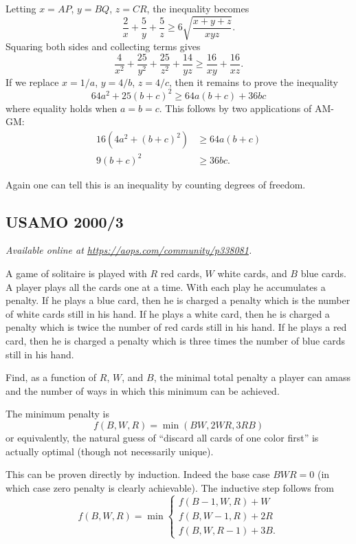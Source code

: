 \documentclass[11pt]{scrartcl}
\begin{document}
Letting $x= AP$, $y = BQ$, $z = CR$, the inequality becomes
\[ \frac2x + \frac5y + \frac5z \ge 6\sqrt{\frac{x+y+z}{xyz}}. \]
Squaring both sides and collecting terms gives
\[
  \frac{4}{x^2} + \frac{25}{y^2} + \frac{25}{z^2} + \frac{14}{yz}
  \ge \frac{16}{xy} + \frac{16}{xz}.
\]
If we replace $x=1/a$, $y=4/b$, $z=4/c$,
then it remains to prove the inequality
\[ 64a^2 + 25(b+c)^2 \ge 64a(b+c) + 36bc \]
where equality holds when $a=b=c$.
This follows by two applications of AM-GM:
\begin{align*}
  16 \left( 4a^2 + (b+c)^2 \right) &\ge 64a(b+c) \\
  9(b+c)^2 &\ge 36bc.
\end{align*}

Again one can tell this is an inequality by counting
degrees of freedom.
\pagebreak

\subsection{USAMO 2000/3}
\textsl{Available online at \url{https://aops.com/community/p338081}.}
\begin{mdframed}[style=mdpurplebox,frametitle={Problem statement}]
A game of solitaire is played with $R$ red cards,
$W$ white cards, and $B$ blue cards.
A player plays all the cards one at a time.
With each play he accumulates a penalty.
If he plays a blue card, then he is charged a penalty
which is the number of white cards still in his hand.
If he plays a white card, then he is charged a penalty
which is twice the number of red cards still in his hand.
If he plays a red card, then he is charged a penalty
which is three times the number of blue cards still in his hand.

Find, as a function of $R$, $W$, and $B$, the minimal total penalty
a player can amass and the number of ways in which this minimum can be achieved.
\end{mdframed}
The minimum penalty is
\[ f(B,W,R) = \min (BW, 2WR, 3RB) \]
or equivalently, the natural guess of
``discard all cards of one color first''
is actually optimal (though not necessarily unique).

This can be proven directly by induction.
Indeed the base case $BWR = 0$
(in which case zero penalty is clearly achievable).
The inductive step follows from
\[ f(B,W,R) = \min
  \begin{cases}
    f(B-1,W,R) + W \\
    f(B,W-1,R) + 2R \\
    f(B,W,R-1) + 3B.
  \end{cases}
\]
\end{document}
